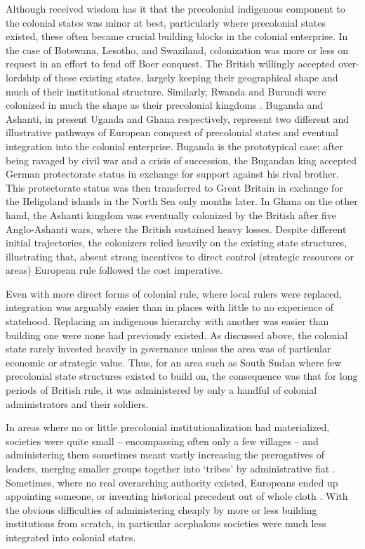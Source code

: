 Although received wisdom has it that the precolonial indigenous component to the
colonial states was minor at best, particularly where precolonial states
existed, these often became crucial building blocks in the colonial enterprise.
In the case of Botswana, Lesotho, and Swaziland, colonization was more or less
on request in an effort to fend off Boer conquest. The British willingly
accepted over-lordship of these existing states, largely keeping their
geographical shape and much of their institutional structure. Similarly, Rwanda
and Burundi were colonized in much the shape as their precolonial kingdoms
\citep[45f]{englebert2013inside}. Buganda and Ashanti, in present Uganda and
Ghana respectively, represent two different and illustrative pathways of
European conquest of precolonial states and eventual integration into the
colonial enterprise. Buganda is the prototypical case; after being ravaged by
civil war and a crisis of succession, the Bugandan king accepted German
protectorate status in exchange for support against his rival brother. This
protectorate status was then transferred to Great Britain in exchange for the
Heligoland islands in the North Sea only months later. In Ghana on the other
hand, the Ashanti kingdom was eventually colonized by the British after five
Anglo-Ashanti wars, where the British sustained heavy losses. Despite different
initial trajectories, the colonizers relied heavily on the existing state
structures, illustrating that, absent strong incentives to direct control
(strategic resources or areas) European rule followed the cost imperative. 

Even with more direct forms of colonial rule, where local rulers were replaced,
integration was arguably easier than in places with little to no experience of
statehood. Replacing an indigenous hierarchy with another was easier than
building one were none had previously existed. As discussed above, the colonial
state rarely invested heavily in governance unless the area was of particular
economic or strategic value. Thus, for an area such as South Sudan where few
precolonial state structures existed to build on, the consequence was that for
long periods of British rule, it was administered by only a handful of colonial
administrators and their soldiers. 

In areas where no or little precolonial institutionalization had materialized,
societies were quite small -- encompassing often only a few villages -- and
administering them sometimes meant vastly increasing the prerogatives of
leaders, merging smaller groups together into `tribes' by administrative fiat
\citep{boone2014property}. Sometimes, where no real overarching authority
existed, Europeans ended up appointing someone, or inventing historical
precedent out of whole cloth \citep{mamdani1996citizen}. With the obvious
difficulties of administering cheaply by more or less building institutions
from scratch, in particular acephalous societies were much less integrated into
colonial states.  

